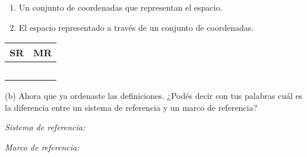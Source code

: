 \documentclass[a4paper,12pt,twoside]{book}
\begin{document}
\begin{mdframed}[style=ejercicio-conceptual]
\begin{enumerate}
        \item Un conjunto de coordenadas que representan el espacio.
        
        \item El espacio representado a través de un conjunto de coordenadas.
    \end{enumerate}

    \begin{center}
        \begin{tabular}{|c|c|}
            \hline
            SR & MR
            \\
            \hline
            &\\
            &\\
            &\\
            &\\
            &\\
            \hline
        \end{tabular}
    \end{center}

    (b) Ahora que ya ordenaste las definiciones. ¿Podés decir con tus palabras cuál es la diferencia entre un sistema de referencia y un marco de referencia?

    \vspace{1em}
    \emph{Sistema de referencia:}
    \vspace{4em}
    
    \emph{Marco de referencia:}
    \vspace{4em}
\end{mdframed}
\end{document}
